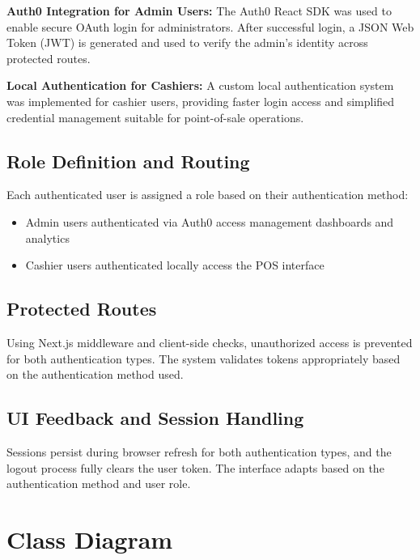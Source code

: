 \textbf{Auth0 Integration for Admin Users:}
The Auth0 React SDK was used to enable secure OAuth login for administrators. After successful login, a JSON Web Token (JWT) is generated and used to verify the admin's identity across protected routes.

\textbf{Local Authentication for Cashiers:}
A custom local authentication system was implemented for cashier users, providing faster login access and simplified credential management suitable for point-of-sale operations.

\subsection*{Role Definition and Routing}

Each authenticated user is assigned a role based on their authentication method:
\begin{itemize}
  \item Admin users authenticated via Auth0 access management dashboards and analytics
  \item Cashier users authenticated locally access the POS interface
\end{itemize}

\subsection*{Protected Routes}

Using Next.js middleware and client-side checks, unauthorized access is prevented for both authentication types. The system validates tokens appropriately based on the authentication method used.

\subsection*{UI Feedback and Session Handling}

Sessions persist during browser refresh for both authentication types, and the logout process fully clears the user token. The interface adapts based on the authentication method and user role.

\section{Class Diagram}

